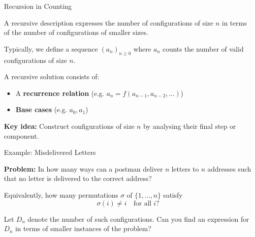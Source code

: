 \begin{frame}{Recursion in Counting}

\begin{sqt:definition}
A recursive description expresses the number of configurations of size $n$
in terms of the number of configurations of smaller sizes.
\end{sqt:definition}

\medskip

Typically, we define a sequence $(a_n)_{n\geq 0}$ where $a_n$ counts the number of valid configurations of size $n$.

\medskip

A recursive solution consists of:
\begin{itemize}
    \item A \textbf{recurrence relation} (e.g. $a_n = f(a_{n-1}, a_{n-2}, \dots)$)
    \item \textbf{Base cases} (e.g. $a_0, a_1$)
\end{itemize}

\medskip

\textbf{Key idea:} Construct configurations of size $n$ by analysing their final step or component.

\end{frame}

\begin{frame}{Example: Misdelivered Letters}

\textcolor{sqt-question}{
\textbf{Problem:} In how many ways can a postman deliver $n$ letters to $n$ addresses such that no letter is delivered to the correct address?
}

\medskip

Equivalently, how many permutations $\sigma$ of $\{1,\dots,n\}$ satisfy
\[
\sigma(i) \neq i \quad \text{for all } i?
\]

\medskip

Let $D_n$ denote the number of such configurations. Can you find an expression for $D_n$
in terms of smaller instances of the problem?

\end{frame}

